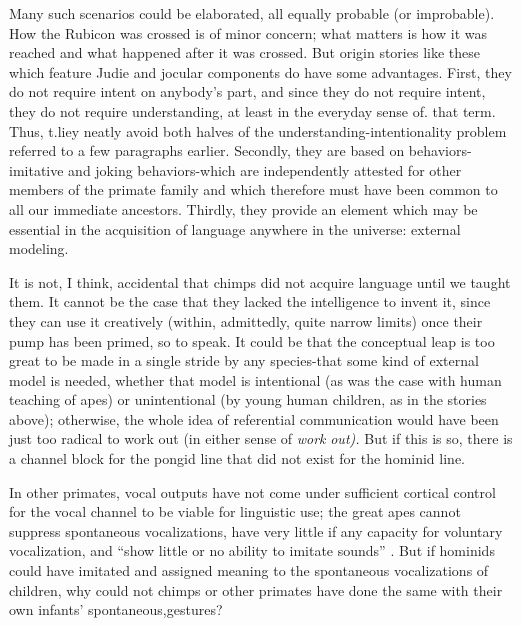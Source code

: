 
Many such scenarios could be elaborated, all equally probable (or improbable). How the Rubicon was crossed is of minor concern; what matters is how it was reached and what happened after it was crossed. But origin stories like these which feature Judie and jocular compo\-nents do have some advantages. First, they do not require intent on anybody's part, and since they do not require intent, they do not require understanding, at least in the everyday sense of. that term. Thus, t.liey neatly avoid both halves of the understanding-intentionality problem referred to a few paragraphs earlier. Secondly, they are based on behaviors- imitative and joking behaviors-which are independently attested for other members of the primate family and which therefore must have been common to all our immediate ancestors. Thirdly, they provide an element which may be essential in the acquisition of lan\-guage anywhere in the universe: external modeling.

It is not, I think, accidental that chimps did not acquire language until we taught them. It cannot be the case that they lacked the intelli\-gence to invent it, since they can use it creatively (within, admittedly, quite narrow limits) once their pump has been primed, so to speak. It could be that the conceptual leap is too great to be made in a single stride by any species-that some kind of external model is needed, whether that model is intentional (as was the case with human teaching of apes) or unintentional (by young human children, as in the stories above); otherwise, the whole idea of referential communication would have been just too radical to work out (in either sense of \textit{work} \textit{out}\textit{).} But if this is so, there is a channel block for the pongid line that did not exist for the hominid line.

In other primates, vocal outputs have not come under sufficient cortical control for the vocal channel to be viable for linguistic use; the great apes cannot suppress spontaneous vocalizations, have very little if any capacity for voluntary vocalization, and ``show little or no ability to imitate sounds'' \citep{Dingwall1979}. But if hominids could have imitated and assigned meaning to the spontaneous vocalizations of children, why could not chimps or other primates have done the same with their own infants' spontaneous,gestures?


